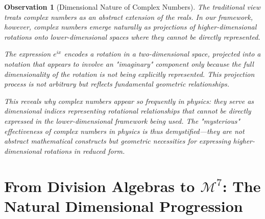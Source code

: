 \documentclass{article}
\newtheorem{observation}{Observation}
\begin{document}
\begin{observation}[Dimensional Nature of Complex Numbers]
The traditional view treats complex numbers as an abstract extension of the reals. In our framework, however, complex numbers emerge naturally as projections of higher-dimensional rotations onto lower-dimensional spaces where they cannot be directly represented.

The expression $e^{ix}$ encodes a rotation in a two-dimensional space, projected into a notation that appears to involve an "imaginary" component only because the full dimensionality of the rotation is not being explicitly represented. This projection process is not arbitrary but reflects fundamental geometric relationships.

This reveals why complex numbers appear so frequently in physics: they serve as dimensional indices representing rotational relationships that cannot be directly expressed in the lower-dimensional framework being used. The "mysterious" effectiveness of complex numbers in physics is thus demystified—they are not abstract mathematical constructs but geometric necessities for expressing higher-dimensional rotations in reduced form.
\end{observation}

\section{From Division Algebras to $\mathcal{M}^7$: The Natural Dimensional Progression}
\end{document}
